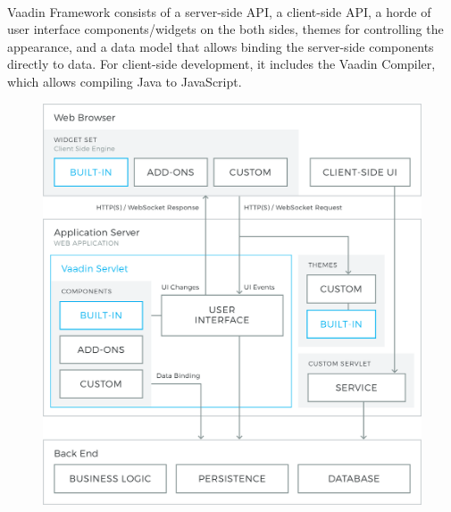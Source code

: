 \documentclass{article}
\begin{document}
			\paragraph{}Vaadin Framework consists of a server-side API, a client-side API, a horde of user interface components/widgets on the both sides, themes for controlling the appearance, and a data model that allows binding the server-side components directly to data. For client-side development, it includes the Vaadin Compiler, which allows compiling Java to JavaScript.
			\begin{figure}[H]
			\begin{center}
			\includegraphics[width=.8\linewidth]{Images/Appendix/vaadin4.png}
			\label{fig:V4}
			\end{center}
			\end{figure}
\end{document}
